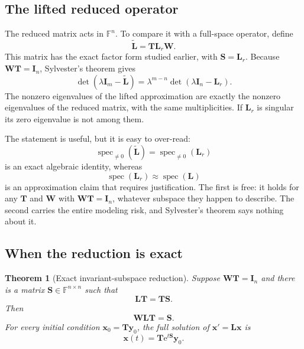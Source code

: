 \documentclass[11pt]{article}
\newcommand{\F}{\mathbb{F}}
\newcommand{\I}{\mathbf{I}}
\newcommand{\mat}[1]{\mathbf{#1}}
\newcommand{\vect}[1]{\mathbf{#1}}
\newcommand{\spec}{\operatorname{spec}}
\newcommand{\e}{\mathrm{e}}
\newtheorem{theorem}{Theorem}[section]
\theoremstyle{definition}
\theoremstyle{remark}
\begin{document}
\subsection{The lifted reduced operator}

The reduced matrix acts in \(\F^n\). To compare it with a full-space operator, define
\begin{equation}
  \widetilde{\mat{L}}
  =\mat{T}\mat{L}_r\mat{W}.
  \label{eq:lifted-reduced-operator}
\end{equation}
This matrix has the exact factor form studied earlier, with \(\mat{S}=\mat{L}_r\). Because \(\mat{W}\mat{T}=\I_n\), Sylvester's theorem gives
\begin{equation}
  \det(\lambda\I_m-\widetilde{\mat{L}})
  =\lambda^{m-n}
   \det(\lambda\I_n-\mat{L}_r).
  \label{eq:lifted-reduced-spectrum}
\end{equation}
The nonzero eigenvalues of the lifted approximation are exactly the nonzero eigenvalues of the reduced matrix, with the same multiplicities. If \(\mat{L}_r\) is singular its zero eigenvalue is not among them.

The statement is useful, but it is easy to over-read:
\begin{equation}
  \spec_{\neq0}(\widetilde{\mat{L}})
  =\spec_{\neq0}(\mat{L}_r)
  \label{eq:exact-lifted-spectrum}
\end{equation}
is an exact algebraic identity, whereas
\begin{equation}
  \spec(\mat{L}_r)
  \approx\spec(\mat{L})
  \label{eq:approx-full-spectrum}
\end{equation}
is an approximation claim that requires justification. The first is free: it holds for any \(\mat{T}\) and \(\mat{W}\) with \(\mat{W}\mat{T}=\I_n\), whatever subspace they happen to describe. The second carries the entire modeling risk, and Sylvester's theorem says nothing about it.

\subsection{When the reduction is exact}

\begin{theorem}[Exact invariant-subspace reduction]
\label{thm:invariant-subspace-reduction}
Suppose \(\mat{W}\mat{T}=\I_n\) and there is a matrix \(\mat{S}\in\F^{n\times n}\) such that
\begin{equation}
  \mat{L}\mat{T}=\mat{T}\mat{S}.
  \label{eq:invariance-condition}
\end{equation}
Then
\begin{equation}
  \mat{W}\mat{L}\mat{T}=\mat{S}.
  \label{eq:projected-S}
\end{equation}
For every initial condition \(\vect{x}_0=\mat{T}\vect{y}_0\), the full solution of
\(\vect{x}'=\mat{L}\vect{x}\) is
\begin{equation}
  \vect{x}(t)=\mat{T}\e^{t\mat{S}}\vect{y}_0.
  \label{eq:invariant-exact-solution}
\end{equation}
\end{theorem}
\end{document}
